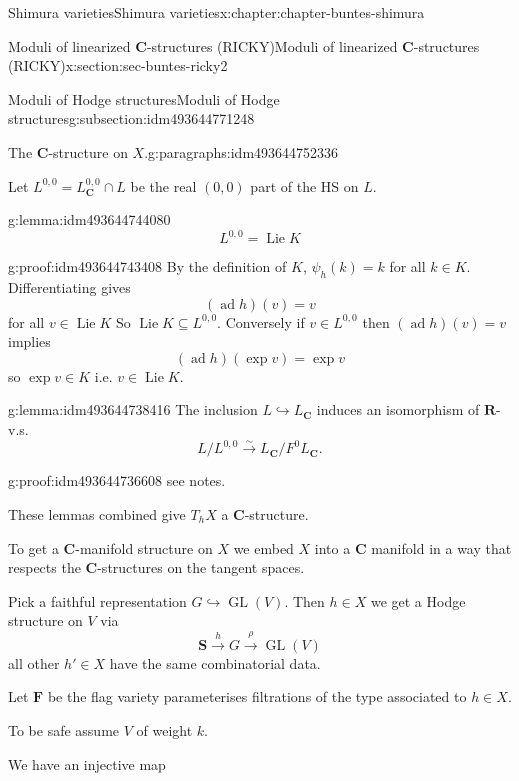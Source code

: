 \documentclass[oneside,10pt,]{book}
\numberwithin{equation}{section}
\DeclareMathOperator{\Lie}{Lie}
\newcommand{\RR}{\mathbf{R}}
\newcommand{\CC}{\mathbf{C}}
\DeclareMathOperator{\ad}{ad}
\DeclareMathOperator{\GL}{GL}
\begin{document}
\begin{chapterptx}{Shimura varieties}{}{Shimura varieties}{}{}{x:chapter:chapter-buntes-shimura}
\begin{sectionptx}{Moduli of linearized \(\CC\)-structures (RICKY)}{}{Moduli of linearized \(\CC\)-structures (RICKY)}{}{}{x:section:sec-buntes-ricky2}
\begin{subsectionptx}{Moduli of Hodge structures}{}{Moduli of Hodge structures}{}{}{g:subsection:idm493644771248}
\begin{paragraphs}{The \(\CC\)-structure on \(X\).}{g:paragraphs:idm493644752336}
\par
Let \(L^{0,0} = L_\CC^{0,0} \cap L\) be the real \((0,0)\) part of the HS on \(L\).%
\begin{lemma}{}{}{g:lemma:idm493644744080}%
%
\begin{equation*}
L^{0,0} = \Lie K
\end{equation*}
%
\end{lemma}
\begin{proofptx}{}{g:proof:idm493644743408}
By the definition of \(K\), \(\psi_h(k) = k\) for all \(k \in K\). Differentiating gives%
\begin{equation*}
(\ad h) (v) = v
\end{equation*}
for all \(v \in \Lie K\) So \(\Lie K  \subseteq L^{0,0}\). Conversely if \(v \in L^{0,0}\) then \((\ad h) (v)=v\) implies%
\begin{equation*}
(\ad h)(\exp v) = \exp v
\end{equation*}
so \(\exp v \in K\) i.e. \(v \in \Lie K\).%
\end{proofptx}
\begin{lemma}{}{}{g:lemma:idm493644738416}%
The inclusion \(L \hookrightarrow L_\CC\) induces an isomorphism of \(\RR\)-v.s.%
\begin{equation*}
L/L^{0,0} \xrightarrow\sim L_\CC / F^0 L_\CC\text{.}
\end{equation*}
%
\end{lemma}
\begin{proofptx}{}{g:proof:idm493644736608}
see notes.%
\end{proofptx}
These lemmas combined give \(T_h X\) a  \(\CC\)-structure.%
\par
To get a \(\CC\)-manifold structure on \(X\) we embed \(X\) into a \(\CC\) manifold in a way that respects the \(\CC\)-structures on the tangent spaces.%
\par
Pick a faithful representation \(G \hookrightarrow \GL(V)\). Then \(h \in X\) we get a Hodge structure on \(V\) via%
\begin{equation*}
\mathbf S \xrightarrow h G \xrightarrow \rho \GL(V)
\end{equation*}
all other \(h' \in X\) have the same combinatorial data.%
\par
Let \(\mathbf F\) be the flag variety parameterises filtrations of the type associated to \(h \in X\).%
\par
To be safe assume \(V\) of weight \(k\).%
\par
We have an injective map%
\begin{equation*}

\end{equation*}
\end{paragraphs}
\end{subsectionptx}
\end{sectionptx}
\end{chapterptx}
\end{document}
